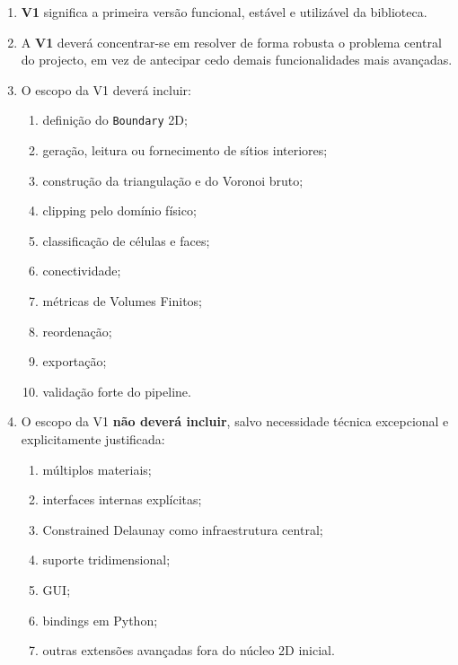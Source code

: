 \begin{enumerate}
    \item \textbf{V1} significa a primeira versão funcional, estável e utilizável da biblioteca.
    \item A \textbf{V1} deverá concentrar-se em resolver de forma robusta o problema central do projecto, em vez de antecipar cedo demais funcionalidades mais avançadas.
    \item O escopo da V1 deverá incluir:
    \begin{enumerate}
        \item definição do \texttt{Boundary} 2D;
        \item geração, leitura ou fornecimento de sítios interiores;
        \item construção da triangulação e do Voronoi bruto;
        \item clipping pelo domínio físico;
        \item classificação de células e faces;
        \item conectividade;
        \item métricas de Volumes Finitos;
        \item reordenação;
        \item exportação;
        \item validação forte do pipeline.
    \end{enumerate}
    \item O escopo da V1 \textbf{não deverá incluir}, salvo necessidade técnica excepcional e explicitamente justificada:
    \begin{enumerate}
        \item múltiplos materiais;
        \item interfaces internas explícitas;
        \item Constrained Delaunay como infraestrutura central;
        \item suporte tridimensional;
        \item GUI;
        \item bindings em Python;
        \item outras extensões avançadas fora do núcleo 2D inicial.
    \end{enumerate}
\end{enumerate}
